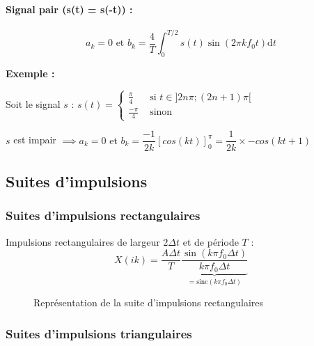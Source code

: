 \documentclass[a4paper,12pt]{article}
\begin{document}
\paragraph{Signal pair (s(t) = s(-t)) :}
\[ a_k = 0 \text{ et } b_k = \dfrac{4}{T} \int_{0}^{T/2} s(t) \sin(2\pi kf_0 t) \mathrm{d}t \]

\textbf{Exemple :}

Soit le signal $s$ : $s(t) =
\begin{cases}
    \frac{\pi}{4} & \text{ si } t \in ] 2n\pi ; (2n+1)\pi [ \\
    \frac{-\pi}{4} & \text{ sinon}
\end{cases}$

$s$ est impair $\implies a_k = 0 \text{ et } b_k = \dfrac{-1}{2k} [cos(kt)]_{0}^{\pi} = \dfrac{1}{2k} \times -cos(kt+1)$

\subsection{Suites d'impulsions}

\subsubsection{Suites d'impulsions rectangulaires}

Impulsions rectangulaires de largeur $2\Delta t$ et de période $T$ :
\[ X(ik) = \dfrac{A\Delta t}{T} \underbrace{\dfrac{\sin(k\pi f_0 \Delta t)}{k\pi f_0 \Delta t}}_{=\mathrm{sinc}(k\pi f_0 \Delta t)} \]

\begin{figure}[!htbp]
	\centering
	\caption{Représentation de la suite d'impulsions rectangulaires}
\end{figure}

\subsubsection{Suites d'impulsions triangulaires}
\end{document}
